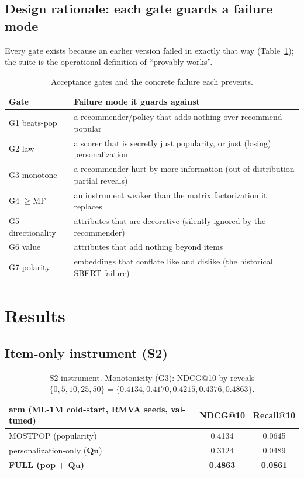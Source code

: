 \documentclass[11pt]{article}
\newcommand{\Q}{\mathbf{Q}}
\newcommand{\uu}{\mathbf{u}}
\begin{document}
\subsection{Design rationale: each gate guards a failure mode}
Every gate exists because an earlier version failed in exactly that way (Table~\ref{tab:gaterat}); the suite is the
operational definition of ``provably works''.
\begin{table}[h]\centering\small
\begin{tabular}{ll}
\toprule
Gate & Failure mode it guards against\\
\midrule
G1 beats-pop & a recommender/policy that adds nothing over recommend-popular\\
G2 law & a scorer that is secretly just popularity, or just (losing) personalization\\
G3 monotone & a recommender hurt by more information (out-of-distribution partial reveals)\\
G4 $\ge$MF & an instrument weaker than the matrix factorization it replaces\\
G5 directionality & attributes that are decorative (silently ignored by the recommender)\\
G6 value & attributes that add nothing beyond items\\
G7 polarity & embeddings that conflate like and dislike (the historical SBERT failure)\\
\bottomrule
\end{tabular}
\caption{Acceptance gates and the concrete failure each prevents.}
\label{tab:gaterat}
\end{table}

\section{Results}\label{sec:results}

\subsection{Item-only instrument (S2)}
\begin{table}[h]\centering\small
\begin{tabular}{lcc}
\toprule
arm (ML-1M cold-start, RMVA seeds, val-tuned) & NDCG@10 & Recall@10\\
\midrule
MOSTPOP (popularity) & 0.4134 & 0.0645\\
personalization-only ($\Q\uu$) & 0.3124 & 0.0489\\
\textbf{FULL (pop $+$ $\Q\uu$)} & \textbf{0.4863} & \textbf{0.0861}\\
\bottomrule
\end{tabular}
\caption{S2 instrument. Monotonicity (G3): NDCG@10 by reveals $\{0,5,10,25,50\}=\{0.4134,0.4170,0.4215,0.4376,0.4863\}$.}
\label{tab:s2}
\end{table}
\end{document}
